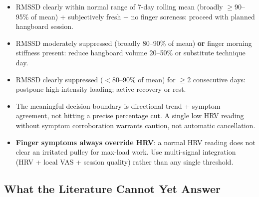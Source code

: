 \begin{itemize}[noitemsep]
  \item RMSSD clearly within normal range of 7-day rolling mean (broadly $\geq$90--95\% of mean) + subjectively fresh + no finger soreness: proceed with planned hangboard session.
  \item RMSSD moderately suppressed (broadly 80--90\% of mean) \textbf{or} finger morning stiffness present: reduce hangboard volume 20--50\% or substitute technique day.
  \item RMSSD clearly suppressed ($<$80--90\% of mean) for $\geq$2 consecutive days: postpone high-intensity loading; active recovery or rest.
  \item The meaningful decision boundary is directional trend + symptom agreement, not hitting a precise percentage cut. A single low HRV reading without symptom corroboration warrants caution, not automatic cancellation.
  \item \textbf{Finger symptoms always override HRV}: a normal HRV reading does not clear an irritated pulley for max-load work. Use multi-signal integration (HRV + local VAS + session quality) rather than any single threshold.
\end{itemize}

\subsection{What the Literature Cannot Yet Answer}

